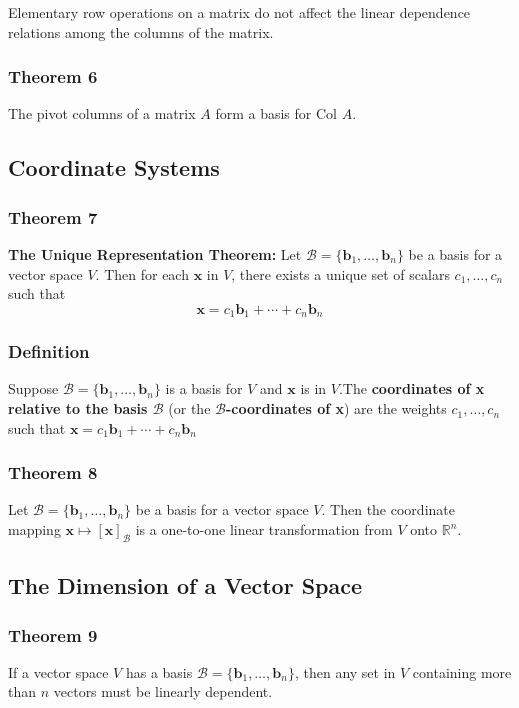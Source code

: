 \documentclass[letterpaper,11pt]{article}
\begin{document}
				Elementary row operations on a matrix do not affect the linear dependence relations among the columns of the matrix.
			\subsubsection{Theorem 6}
				The pivot columns of a matrix $A$ form a basis for Col $A$.
		\subsection{Coordinate Systems}
			\subsubsection{Theorem 7}
				\textbf{The Unique Representation Theorem:} Let $\mathcal{B}=\{\mathbf{b}_1,\dots,\mathbf{b}_n\}$ be a basis for a vector space $V$. Then for each $\mathbf{x}$ in $V$, there exists a unique set of scalars $c_1,\dots,c_n$ such that
				\begin{equation}
					\mathbf{x}=c_1\mathbf{b}_1+\cdots+c_n\mathbf{b}_n
				\end{equation}
			\subsubsection{Definition}
				Suppose $\mathcal{B}=\{\mathbf{b}_1,\dots,\mathbf{b}_n\}$ is a basis for $V$ and $\mathbf{x}$ is in $V$.The \textbf{coordinates of x relative to the basis $\mathcal{B}$} (or the \textbf{$\mathcal{B}$-coordinates of x}) are the weights $c_1,\dots,c_n$ such that $\mathbf{x}=c_1\mathbf{b}_1+\cdots+c_n\mathbf{b}_n$
			\subsubsection{Theorem 8}
				Let $\mathcal{B}=\{\mathbf{b}_1,\dots,\mathbf{b}_n\}$ be a basis for a vector space $V$. Then the coordinate mapping $\mathbf{x}\mapsto[\mathbf{x}]_\mathcal{B}$ is a one-to-one linear transformation from $V$ onto $\mathbb{R}^n$.
		\subsection{The Dimension of a Vector Space}
			\subsubsection{Theorem 9}
				If a vector space $V$ has a basis $\mathcal{B}=\{\mathbf{b}_1,\dots,\mathbf{b}_n\}$, then any set in $V$ containing more than $n$ vectors must be linearly dependent.
\end{document}
